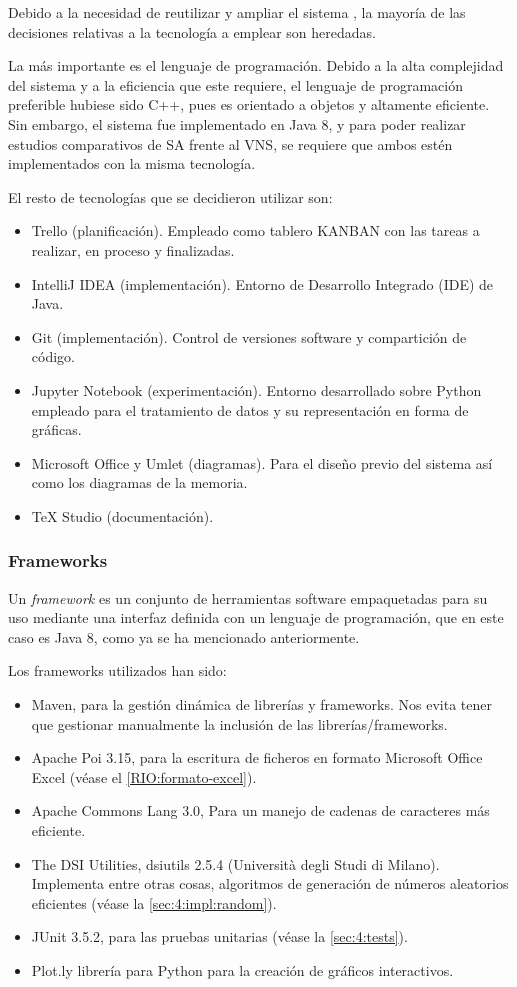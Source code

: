 Debido a la necesidad de reutilizar y ampliar el sistema \legacy{}, la mayoría de las decisiones relativas a la tecnología a emplear son heredadas. 

La más importante es el lenguaje de programación. Debido a la alta complejidad del sistema y a la eficiencia que este requiere, el lenguaje de programación preferible hubiese sido C++, pues es orientado a objetos y altamente eficiente. Sin embargo, el sistema \legacy{} fue implementado en Java 8, y para poder realizar estudios comparativos de SA frente al VNS, se requiere que ambos estén implementados con la misma tecnología.

El resto de tecnologías que se decidieron utilizar son:

\begin{itemize}
	\item Trello (planificación). Empleado como tablero KANBAN con las tareas a realizar, en proceso y finalizadas.
	\item IntelliJ IDEA (implementación). Entorno de Desarrollo Integrado (IDE) de Java.
	\item Git (implementación). Control de versiones software y compartición de código.
	\item Jupyter Notebook (experimentación). Entorno desarrollado sobre Python empleado para el tratamiento de datos y su representación en forma de gráficas.
	\item Microsoft Office y Umlet (diagramas). Para el diseño previo del sistema así como los diagramas de la memoria.
	\item \TeX{} Studio (documentación).
\end{itemize}

\subsubsection{Frameworks}
Un \textit{framework} es un conjunto de herramientas software empaquetadas para su uso mediante una interfaz definida con un lenguaje de programación, que en este caso es Java 8, como ya se ha mencionado anteriormente.

Los frameworks utilizados han sido:

\begin{itemize}
	\item Maven, para la gestión dinámica de librerías y frameworks. Nos evita tener que gestionar manualmente la inclusión de las librerías/frameworks.
	\item Apache Poi 3.15, para la escritura de ficheros en formato Microsoft Office Excel (véase el \ref{RIO:formato-excel}).
	\item Apache Commons Lang 3.0, Para un manejo de cadenas de caracteres más eficiente.
	\item The DSI Utilities, dsiutils 2.5.4 (Università degli Studi di Milano). Implementa entre otras cosas, algoritmos de generación de números aleatorios eficientes (véase la \autoref{sec:4:impl:random}).
	\item JUnit 3.5.2, para las pruebas unitarias (véase la \autoref{sec:4:tests}).
	\item Plot.ly librería para Python para la creación de gráficos interactivos.
\end{itemize}

